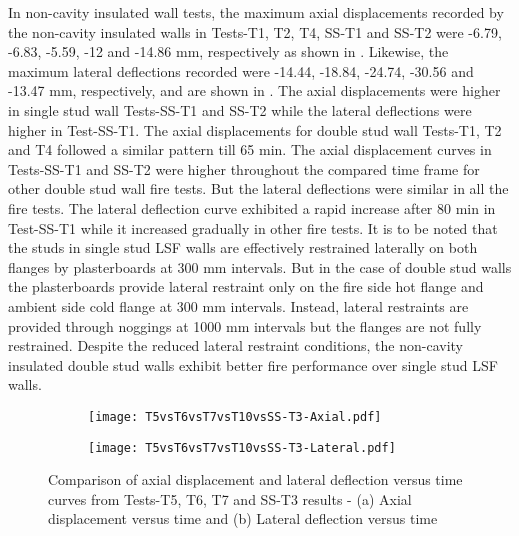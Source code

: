 In non-cavity insulated wall tests, the maximum axial displacements recorded by the non-cavity insulated walls in Tests-T1, T2, T4, SS-T1 and SS-T2 were -6.79, -6.83, -5.59, -12 and -14.86 mm, respectively as shown in . Likewise, the maximum lateral deflections recorded were -14.44, -18.84, -24.74, -30.56 and -13.47 mm, respectively, and are shown in . The axial displacements were higher in single stud wall Tests-SS-T1 and SS-T2 while the lateral deflections were higher in Test-SS-T1. The axial displacements for double stud wall Tests-T1, T2 and T4 followed a similar pattern till 65 min. The axial displacement curves in Tests-SS-T1 and SS-T2 were higher throughout the compared time frame for other double stud wall fire tests. But the lateral deflections were similar in all the fire tests. The lateral deflection curve exhibited a rapid increase after 80 min in Test-SS-T1 while it increased gradually in other fire tests. It is to be noted that the studs in single stud LSF walls are effectively restrained laterally on both flanges by plasterboards at 300 mm intervals. But in the case of double stud walls the plasterboards provide lateral restraint only on the fire side hot flange and ambient side cold flange at 300 mm intervals. Instead, lateral restraints are provided through noggings at 1000 mm intervals but the flanges are not fully restrained. Despite the reduced lateral restraint conditions, the non-cavity insulated double stud walls exhibit better fire performance over single stud LSF walls.
\begin{figure}[!htbp]
	\centering
	\begin{subfigure}[b]{0.7\textwidth}
		\centering
		\texttt{[image: T5vsT6vsT7vsT10vsSS-T3-Axial.pdf]}
		\caption{}
		\label{subfig:T5vsT6vsT7vsT10vsSS-T3-Axial}
	\end{subfigure}
	\begin{subfigure}[b]{0.7\textwidth}
		\centering
		\texttt{[image: T5vsT6vsT7vsT10vsSS-T3-Lateral.pdf]}
		\caption{}
		\label{subfig:T5vsT6vsT7vsT10vsSS-T3-Lateral}
	\end{subfigure}
	   \caption{Comparison of axial displacement and lateral deflection versus time curves from Tests-T5, T6, T7 and SS-T3 results - (a) Axial displacement versus time and (b) Lateral deflection versus time}
	   \label{fig:T5vsT6vsT7vsT10vsSS-T3-Displacement}
\end{figure}

